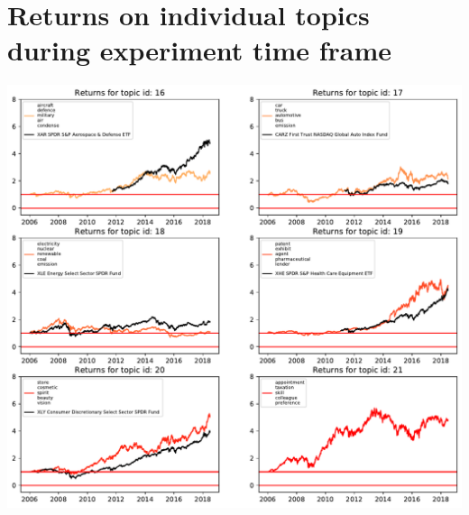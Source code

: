 \documentclass[12pt,journal,letterpaper,oneside,onecolumn]{IEEEtran}
\begin{document}
\section{Returns on individual topics during experiment time frame}
\begin{center}
\includegraphics[width=1\linewidth]{images/returns_per_topic_page_2.pdf}
\end{center}



\end{document}
